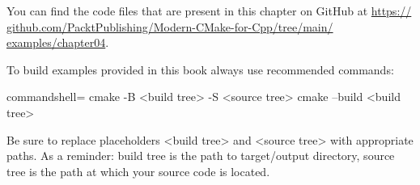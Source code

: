 You can find the code files that are present in this chapter on GitHub at \url{https:// github.com/PacktPublishing/Modern-CMake-for-Cpp/tree/main/ examples/chapter04}.

To build examples provided in this book always use recommended commands:

\begin{tcblisting}{commandshell={}}
cmake -B <build tree> -S <source tree>
cmake --build <build tree>
\end{tcblisting}

Be sure to replace placeholders <build tree> and <source tree> with appropriate paths. As a reminder: build tree is the path to target/output directory, source tree is the path at which your source code is located.